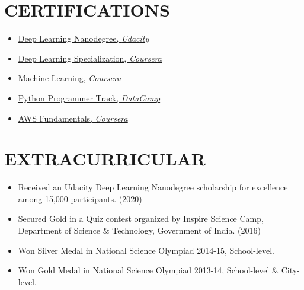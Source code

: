 \documentclass[letterpaper,11pt]{article}
\newcommand{\resumeItem}[1]{
  \item\small{
    {#1 \vspace{-2pt}}
  }
}
\newcommand{\resumeItemListStart}{\begin{itemize}}
\newcommand{\resumeItemListEnd}{\end{itemize}\vspace{-5pt}}
\begin{document}
\section{CERTIFICATIONS}
\begin{multicols}{2}
  \begin{itemize}[itemsep=-1pt, parsep=5pt]
    \item {\href{https://graduation.udacity.com/confirm/ZFNDVDQU}{Deep Learning Nanodegree, \textit{Udacity}} {\raisebox{-0.1\height}\faExternalLink}}
    \item {\href{https://www.coursera.org/account/accomplishments/specialization/EJWXYS5SBM2E}{Deep Learning Specialization, \textit{Coursera}} {\raisebox{-0.1\height}\faExternalLink}}
    \item {\href{https://www.coursera.org/account/accomplishments/verify/DB2AH7JVG9KU}{Machine Learning, \textit{Coursera}} {\raisebox{-0.1\height}\faExternalLink}}
    \item {\href{https://www.datacamp.com/statement-of-accomplishment/track/ca45219c995c9ea42262772e58872ae77889c14e}{Python Programmer Track, \textit{DataCamp}} {\raisebox{-0.1\height}\faExternalLink}}
    \item {\href{https://www.coursera.org/account/accomplishments/specialization/LLHNWWQWQHQM}{AWS Fundamentals, \textit{Coursera}} {\raisebox{-0.1\height}\faExternalLink}}
  \end{itemize}
\end{multicols}
\vspace*{0.5\multicolsep}


\section{EXTRACURRICULAR}
\resumeItemListStart[itemsep=2pt]
\resumeItem{\normalsize{Received an Udacity Deep Learning Nanodegree scholarship for excellence among 15,000 participants. (2020)}}
\resumeItem{\normalsize{Secured Gold in a Quiz contest organized by Inspire Science Camp, Department of Science \& Technology, Government of India. (2016)}}
\resumeItem{\normalsize{Won Silver Medal in National Science Olympiad 2014-15, School-level.}}
\resumeItem{\normalsize{Won Gold Medal in National Science Olympiad 2013-14, School-level \& City-level.}}
\resumeItemListEnd
\end{document}

